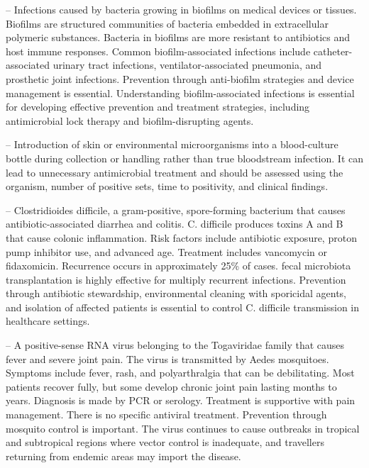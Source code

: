 -- Infections caused by bacteria growing in biofilms on medical devices or tissues. Biofilms are structured communities of bacteria embedded in extracellular polymeric substances. Bacteria in biofilms are more resistant to antibiotics and host immune responses. Common biofilm-associated infections include catheter-associated urinary tract infections, ventilator-associated pneumonia, and prosthetic joint infections. Prevention through anti-biofilm strategies and device management is essential. Understanding biofilm-associated infections is essential for developing effective prevention and treatment strategies, including antimicrobial lock therapy and biofilm-disrupting agents.

-- Introduction of skin or environmental microorganisms into a blood-culture bottle during collection or handling rather than true bloodstream infection. It can lead to unnecessary antimicrobial treatment and should be assessed using the organism, number of positive sets, time to positivity, and clinical findings.

-- Clostridioides difficile, a gram-positive, spore-forming bacterium that causes antibiotic-associated diarrhea and colitis. C. difficile produces toxins A and B that cause colonic inflammation. Risk factors include antibiotic exposure, proton pump inhibitor use, and advanced age. Treatment includes vancomycin or fidaxomicin. Recurrence occurs in approximately 25\% of cases. fecal microbiota transplantation is highly effective for multiply recurrent infections. Prevention through antibiotic stewardship, environmental cleaning with sporicidal agents, and isolation of affected patients is essential to control C. difficile transmission in healthcare settings.

-- A positive-sense RNA virus belonging to the Togaviridae family that causes fever and severe joint pain. The virus is transmitted by Aedes mosquitoes. Symptoms include fever, rash, and polyarthralgia that can be debilitating. Most patients recover fully, but some develop chronic joint pain lasting months to years. Diagnosis is made by PCR or serology. Treatment is supportive with pain management. There is no specific antiviral treatment. Prevention through mosquito control is important. The virus continues to cause outbreaks in tropical and subtropical regions where vector control is inadequate, and travellers returning from endemic areas may import the disease.

